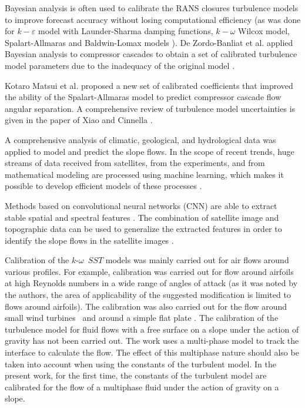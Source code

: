 \documentclass[mathematics,article,submit,pdftex,moreauthors]{Definitions/mdpi}
\begin{document}
Bayesian analysis is often used to calibrate the RANS closures turbulence models to improve forecast accuracy without losing computational efficiency (as was done for $k-\varepsilon$ model with Launder-Sharma damping functions, $k-\omega$ Wilcox model, Spalart-Allmaras and Baldwin-Lomax models \cite{Edeling2014a,Edeling2014b}). De Zordo-Banliat et al. applied Bayesian analysis to compressor cascades to obtain a set of calibrated turbulence model parameters due to the inadequacy of the original model \cite{deZordoBanliat2020}.

Kotaro Matsui et al. \cite{Matsui2021} proposed a new set of calibrated coefficients that improved the ability of the Spalart-Allmaras model to predict compressor cascade flow angular separation. A comprehensive review of turbulence model uncertainties is given in the paper of Xiao and Cinnella \cite{Xiao2019}.


A comprehensive analysis of climatic, geological, and hydrological data was applied to model and predict the slope flows. In the scope of recent trends, huge streams of data received from satellites, from the experiments, and from mathematical modeling are processed using machine learning, which makes it possible to develop efficient models of these processes \cite{GeoML, Ma2020}.

Methods based on convolutional neural networks (CNN) are able to extract stable spatial and spectral features \cite{Maggiori2017}. The combination of satellite image and topographic data can be used to generalize the extracted features in order to identify the slope flows in the satellite images \cite{Qin2021, Prakash2021}.

Calibration of the $k$-$\omega$~$SST$ models \cite{Menter1993, Menter1994, MenterKuntzLangtry2003} was mainly carried out for air flows around various profiles. For example, calibration was carried out for flow around airfoils at high Reynolds numbers in a wide range of angles of attack \cite{MatyushenkoGarbaruk2016} (as it was noted by the authors, the area of applicability of the suggested modification is limited to flows around airfoils). The calibration was also carried out for the flow around small wind turbines~\cite{rocha2016case, rocha2014} and around a simple flat plate \cite{kalitzin2016improvements}. 
The calibration of the turbulence model for fluid flows with a free surface on a slope under the action of gravity has not been carried out. The work uses a multi-phase model to track the interface to calculate the flow. The effect of this multiphase nature should also be taken into account when using the constants of the turbulent model. In the present work, for the first time, the constants of the turbulent model are calibrated for the flow of a multiphase fluid under the action of gravity on a slope.
\end{document}
